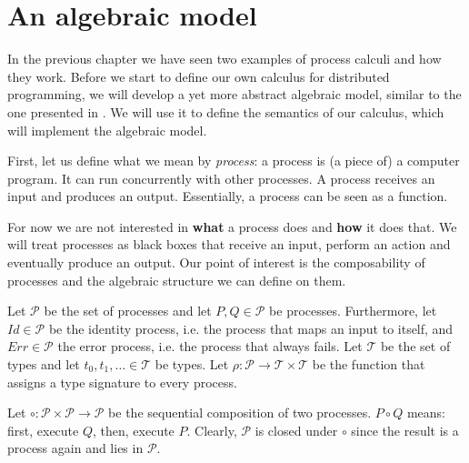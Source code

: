 \chapter{An algebraic model}
In the previous chapter we have seen two examples of process calculi and how they work. Before we start to define our own calculus for distributed programming, we will develop a yet more abstract algebraic model, similar to the one presented in \cite{Hoare:2012:LPU:2368298.2368301}. We will use it to define the semantics of our calculus, which will implement the algebraic model.

First, let us define what we mean by \textit{process}: a process is (a piece of) a computer program. It can run concurrently with other processes. A process receives an input and produces an output. Essentially, a process can be seen as a function. %

For now we are not interested in \textbf{what} a process does and \textbf{how} it does that. We will treat processes as black boxes that receive an input, perform an action and eventually produce an output. Our point of interest is the composability of processes and the algebraic structure we can define on them.

Let $\mathcal{P}$ be the set of processes and let $P, Q \in \mathcal{P}$ be processes. Furthermore, let $Id \in \mathcal{P}$ be the identity process, i.e. the process that maps an input to itself, and $Err \in \mathcal{P}$ the error process, i.e. the process that always fails. Let $\mathcal{T}$ be the set of types and let $t_0, t_1, \ldots \in \mathcal{T}$ be types. Let $\rho \colon \mathcal{P} \to \mathcal{T} \times \mathcal{T}$ be the function that assigns a type signature to every process.

Let $\circ \colon \mathcal{P} \times \mathcal{P} \to \mathcal{P}$ be the sequential composition of two processes. $P \circ Q$ means: first, execute $Q$, then, execute $P$. Clearly, $\mathcal{P}$ is closed under $\circ$ since the result is a process again and lies in $\mathcal{P}$.